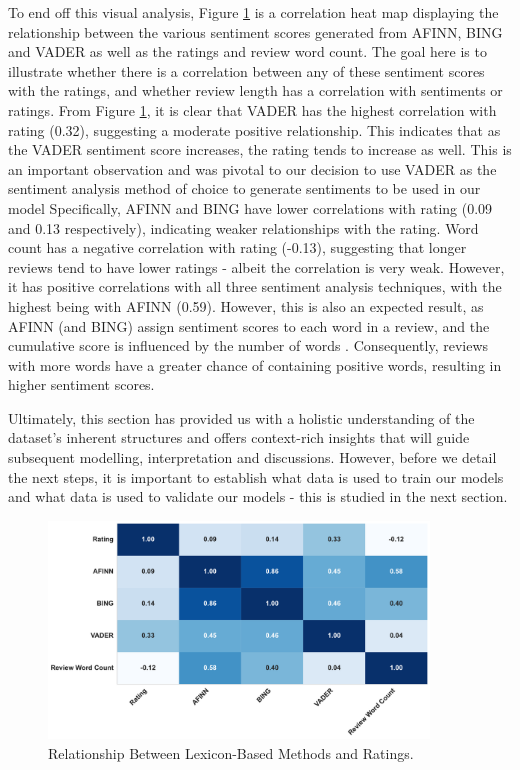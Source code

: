 To end off this visual analysis, Figure \ref{fig:correlation heat map sentiments} is a correlation heat map displaying the relationship between the various sentiment scores generated from AFINN, BING and VADER as well as the ratings and review word count. The goal here is to illustrate  whether there is a correlation between any of these sentiment scores with the ratings, and whether review length has a correlation with sentiments or ratings. From Figure \ref{fig:correlation heat map sentiments}, it is clear that VADER has the highest correlation with rating (0.32), suggesting a moderate positive relationship. This indicates that as the VADER sentiment score increases, the rating tends to increase as well. This is an important observation and was pivotal to our decision to use VADER as the sentiment analysis method of choice to generate sentiments to be used in our model Specifically, AFINN and BING have lower correlations with rating (0.09 and 0.13 respectively), indicating weaker relationships with the rating.  Word count has a negative correlation with rating (-0.13), suggesting that longer reviews tend to have lower ratings - albeit the correlation is very weak. However, it has positive correlations with all three sentiment analysis techniques, with the highest being with AFINN (0.59). However, this is also an expected result, as AFINN (and BING) assign sentiment scores to each word in a review, and the cumulative score is influenced by the number of words \cite{haque2018sentiment}. Consequently, reviews with more words have a greater chance of containing positive words, resulting in higher sentiment scores. 

Ultimately, this section has provided us with a holistic understanding of the dataset's inherent structures and offers context-rich insights that will guide subsequent modelling, interpretation and discussions. However, before we detail the next steps, it is important to establish what data is used to train our models and what data is used to validate our models - this is studied in the next section. 

\begin{figure}[h]
  \centering
  \includegraphics[width=0.9\textwidth]{Figures/correlation_between_ratings_sentiment_scores_review_length.pdf} %
  \caption{Relationship Between Lexicon-Based Methods and Ratings.}
  \label{fig:correlation heat map sentiments}
\end{figure}


